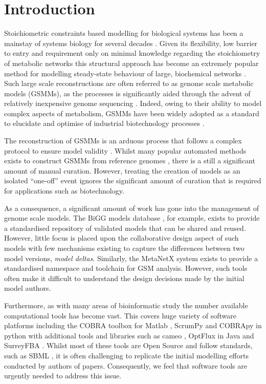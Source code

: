 \documentclass[journal=asbcd6,10pt]{achemso}
\begin{document}
\section{Introduction}
Stoichiometric constraints based modelling for biological systems has been a mainstay of systems biology for several decades \cite{fell1986fat, varma1994stoichiometric}.
Given its flexibility, low barrier to entry and requirement only on minimal knowledge regarding the stoichiometry of metabolic networks this structural approach has become an extremely popular method for modelling steady-state behaviour of large, biochemical networks \cite{kauffman2003advances}.
Such large scale reconstructions are often referred to as genome scale metabolic models (GSMMs), as the processes is significantly aided through the advent of relatively inexpensive genome sequencing \cite{o2015using, land2015insights}.
Indeed, owing to their ability to model complex aspects of metabolism, GSMMs have been widely adopted as a standard to elucidate and optimise of industrial biotechnology processes \cite{kim2017current}.

The reconstruction of GSMMs is an arduous process that follows a complex protocol to ensure model validity \cite{thiele2010protocol}.
Whilst many popular automated methods exists to construct GSMMs from reference genomes \cite{henry2010high, poolman2006scrumpy}, there is a still a significant amount of manual curation.
However, treating the creation of models as an isolated ``one-off'' event ignores the significant amount of curation that is required for applications such as biotechnology.

As a consequence, a significant amount of work has gone into the management of genome scale models.
The BiGG models database \cite{king2015bigg}, for example, exists to provide a standardised repository of validated models that can be shared and reused.
However, little focus is placed upon the collaborative design aspect of such models with few mechanisms existing to capture the differences between two model versions, \textit{model deltas}.
Similarly, the MetaNetX \cite{moretti2016metanetx} system exists to provide a standardised namespace and toolchain for GSM analysis.
However, such tools often make it difficult to understand the design decisions made by the initial model authors.

Furthermore, as with many areas of bioinformatic study the number available computational tools has become vast.
This covers huge variety of software platforms including the COBRA toolbox for Matlab \cite{schellenberger2011quantitative}, ScrumPy and COBRApy in python \cite{poolman2006scrumpy, ebrahim2013cobrapy} with additional tools and libraries such as cameo \cite{cardoso2017cameo}, OptFlux in Java \cite{rocha2010optflux} and SurreyFBA \cite{gevorgyan2010surreyfba}.
Whilst most of these tools are Open Source and follow standards, such as SBML \cite{finney2003systems}, it is often challenging to replicate the initial modelling efforts conducted by authors of papers.
Consequently, we feel that software tools are urgently needed to address this issue.
\end{document}
